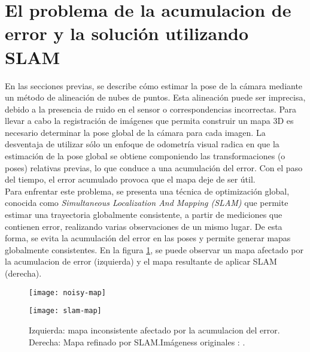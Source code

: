 \section{El problema de la acumulacion de error y la solución utilizando SLAM}
\label{sec:acumulacion-del-error-slam}

En las secciones previas, se describe cómo estimar la pose de la cámara mediante un método de alineación de nubes de puntos. Esta alineación puede ser imprecisa, debido a la presencia de ruido en el sensor o correspondencias incorrectas. Para llevar a cabo la registración de imágenes que permita construir un mapa 3D es necesario determinar la pose global de la cámara para cada imagen. La desventaja de utilizar sólo un enfoque de odometría visual radica en que la estimación de la pose global se obtiene componiendo las transformaciones (o poses) relativas previas, lo que conduce a una acumulación del error. Con el paso del tiempo, el error acumulado provoca que el mapa deje de ser útil. \\
Para enfrentar este problema, se presenta una técnica de optimización global, conocida como \textit{Simultaneous Localization And Mapping (SLAM)} que permite estimar una trayectoria globalmente consistente, a partir de mediciones que contienen error, realizando varias observaciones de un mismo lugar. De esta forma, se evita la acumulación del error en las poses y permite generar mapas globalmente consistentes. En la figura \ref{fig:maps-noisy-slam}, se puede observar un mapa afectado por la acumulacion de error (izquierda) y el mapa resultante de aplicar SLAM (derecha). \\

\begin{figure}[ht]
\centering
\begin{minipage}[h]{.45\textwidth}
\begin{center}
\texttt{[image: noisy-map]}
\end{center}
\end{minipage}
\hfill
\begin{minipage}[h]{.45\textwidth}
\begin{center}
\texttt{[image: slam-map]}
\end{center}
\end{minipage}
\hfill
\caption[Efecto de la acumulacion del error y optimización con SLAM sobre un mapa]
{Izquierda: mapa inconsistente afectado por la acumulacion del error. Derecha: Mapa refinado por SLAM.Imágeness originales : \cite{GrisettiKSB10}.}
\label{fig:maps-noisy-slam}
\end{figure}

